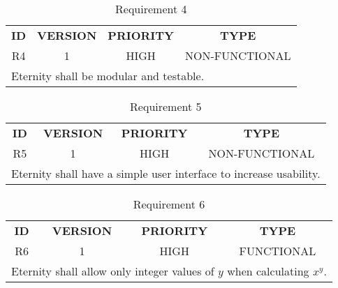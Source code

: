 \documentclass[11pt,a4paper]{report}
\theoremstyle{definition}
\theoremstyle{remark}
\begin{document}
            \begin{table}[ht]
            \centering
                \begin{tabular}{cccc} %
                    \textbf{ID} & \textbf{VERSION} & \textbf{PRIORITY} & \textbf{TYPE}\\
                            R4  &           1      &           HIGH    &      NON-FUNCTIONAL\\
                    \hline
                    \multicolumn{4}{l}{Eternity shall be modular and testable.}
                \end{tabular}
                \caption{Requirement 4}
                \label{tab:table-requirements-4}
            \end{table}
            \vspace{3em}

        \begin{table}[ht]
            \centering
                \begin{tabular}{cccc} %
                    \textbf{ID} & \textbf{VERSION} & \textbf{PRIORITY} & \textbf{TYPE}\\
                            R5  &           1      &           HIGH    &      NON-FUNCTIONAL\\
                    \hline
                    \multicolumn{4}{l}{Eternity shall have a simple user interface to increase usability.}
                \end{tabular}
                \caption{Requirement 5}
                \label{tab:table-requirements-5}
            \end{table}
            \vspace{3em}
            
            \begin{table}[ht]
            \centering
                \begin{tabular}{cccc} %
                    \textbf{ID} & \textbf{VERSION} & \textbf{PRIORITY} & \textbf{TYPE}\\
                            R6  &           1      &           HIGH    &      FUNCTIONAL\\
                    \hline
                    \multicolumn{4}{l}{Eternity shall allow only integer values of $y$ when calculating $x^y$.}
                \end{tabular}
                \caption{Requirement 6}
                \label{tab:table-requirements-6}
            \end{table}
            \vspace{3em}
            
\end{document}
